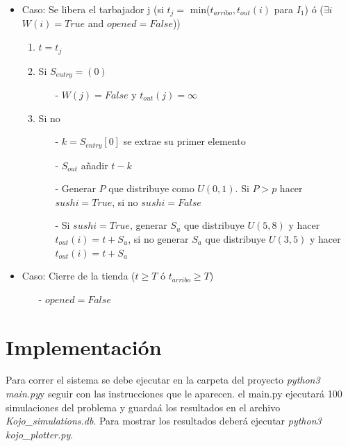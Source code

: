 \documentclass[11pt]{article}
\begin{document}
\begin{itemize}
\begin{enumerate}
\begin{enumerate}
		\end{enumerate}
	\end{enumerate}
	\item Caso: Se libera el tarbajador j (si $t_{j} = $ min($t_{arribo},t_{out}(i)$ para $I_{1}$) \'o ($\exists i$ $ W(i)=True$ and $opened=False$))
	\begin{enumerate}
		\item  $t=t_j$
		\item  Si $S_{entry} = (0)$
		\begin{enumerate}
			\item [-] $W(j)=False$ y $t_{out}(j) = \infty$
		\end{enumerate}
		\item Si no
		\begin{enumerate}
			\item [-]$k = S_{entry}[0] $ se extrae su primer elemento
			\item [-]$S_{out}$ a\~nadir $t - k$
			\item [-]Generar $P$ que distribuye como $U(0,1)$. Si $P>p$ hacer $sushi = True$, si no $sushi= False$
			\item [-]Si $sushi = True$, generar $S_u$ que distribuye $U(5,8)$ y hacer $t_{out}(i)=t+S_u$, si no generar $S_a$ que distribuye $U(3,5)$ y hacer $t_{out}(i)=t+S_a$
		\end{enumerate}
	\end{enumerate}
	\item Caso: Cierre de la tienda ($t\geq T$ \'o $t_{arribo}\geq T$)
		\begin{enumerate}
			\item [-] $opened = False$
		\end{enumerate}
	
\end{itemize}
\section{Implementaci\'on}
Para correr el sistema se debe ejecutar en la carpeta del proyecto \emph{python3 main.py}y seguir con las instrucciones que le aparecen. el main.py ejecutar\'a 100 simulaciones del problema y guarda\'a los resultados en el archivo \emph{Kojo\_simulations.db}. Para mostrar los resultados deberá ejecutar \emph{python3 kojo\_plotter.py}.
\end{document}
